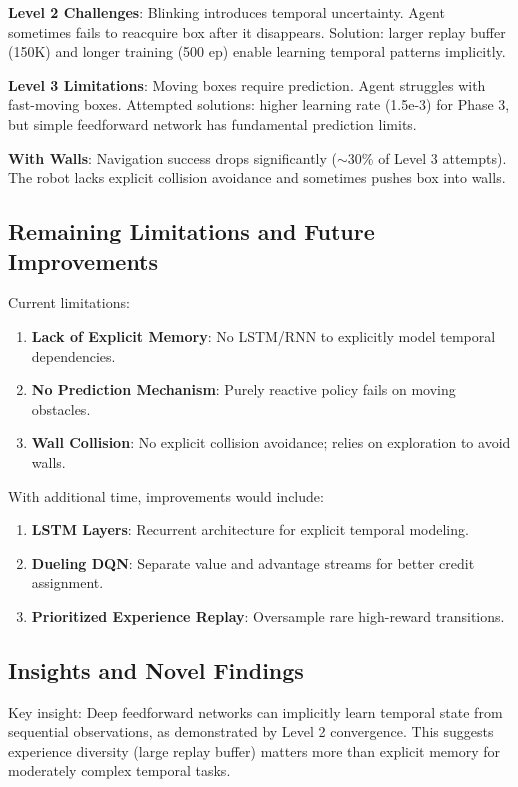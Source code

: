 \documentclass[12pt,a4paper]{article}
\begin{document}
\textbf{Level 2 Challenges}: Blinking introduces temporal uncertainty. Agent sometimes fails to reacquire box after it disappears. Solution: larger replay buffer (150K) and longer training (500 ep) enable learning temporal patterns implicitly.

\textbf{Level 3 Limitations}: Moving boxes require prediction. Agent struggles with fast-moving boxes. Attempted solutions: higher learning rate (1.5e-3) for Phase 3, but simple feedforward network has fundamental prediction limits.

\textbf{With Walls}: Navigation success drops significantly ($\sim$30\% of Level 3 attempts). The robot lacks explicit collision avoidance and sometimes pushes box into walls.

\subsection{Remaining Limitations and Future Improvements}

Current limitations:
\begin{enumerate}
    \item \textbf{Lack of Explicit Memory}: No LSTM/RNN to explicitly model temporal dependencies.
    \item \textbf{No Prediction Mechanism}: Purely reactive policy fails on moving obstacles.
    \item \textbf{Wall Collision}: No explicit collision avoidance; relies on exploration to avoid walls.
\end{enumerate}

With additional time, improvements would include:
\begin{enumerate}
    \item \textbf{LSTM Layers}: Recurrent architecture for explicit temporal modeling.
    \item \textbf{Dueling DQN}: Separate value and advantage streams for better credit assignment.
    \item \textbf{Prioritized Experience Replay}: Oversample rare high-reward transitions.
\end{enumerate}

\subsection{Insights and Novel Findings}

Key insight: Deep feedforward networks can implicitly learn temporal state from sequential observations, as demonstrated by Level 2 convergence. This suggests experience diversity (large replay buffer) matters more than explicit memory for moderately complex temporal tasks.
\end{document}
